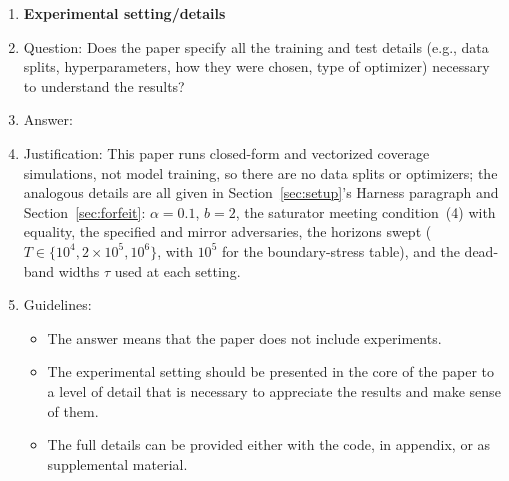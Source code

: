 \begin{enumerate}
\item {\bf Experimental setting/details}
    \item[] Question: Does the paper specify all the training and test details (e.g., data splits, hyperparameters, how they were chosen, type of optimizer) necessary to understand the results?
    \item[] Answer: \answerYes{}
    \item[] Justification: This paper runs closed-form and vectorized coverage simulations, not model training, so there are no data splits or optimizers; the analogous details are all given in Section~\ref{sec:setup}'s Harness paragraph and Section~\ref{sec:forfeit}: $\alpha = 0.1$, $b = 2$, the saturator meeting condition~(4) with equality, the specified and mirror adversaries, the horizons swept ($T \in \{10^4, 2{\times}10^5, 10^6\}$, with $10^5$ for the boundary-stress table), and the dead-band widths $\tau$ used at each setting.
    \item[] Guidelines:
    \begin{itemize}
        \item The answer \answerNA{} means that the paper does not include experiments.
        \item The experimental setting should be presented in the core of the paper to a level of detail that is necessary to appreciate the results and make sense of them.
        \item The full details can be provided either with the code, in appendix, or as supplemental material.
    \end{itemize}


\end{enumerate}
